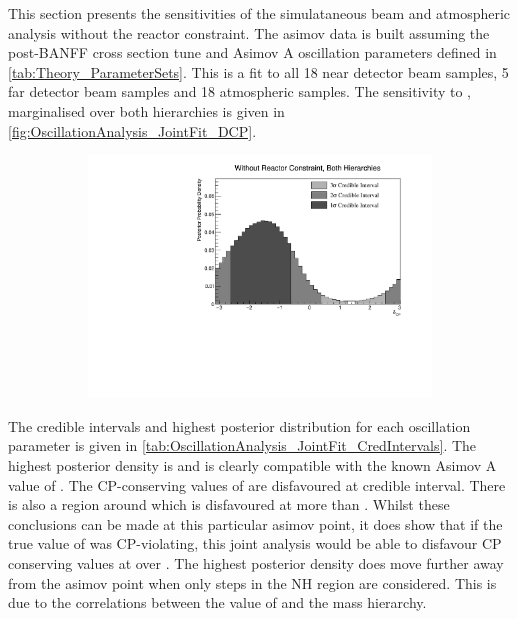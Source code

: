 This section presents the sensitivities of the simulataneous beam and atmospheric analysis without the reactor constraint. The asimov data is built assuming the post-BANFF cross section tune and Asimov A oscillation parameters defined in \autoref{tab:Theory_ParameterSets}. This is a fit to all 18 near detector beam samples, 5 far detector beam samples and 18 atmospheric samples. The sensitivity to \dcp, marginalised over both hierarchies is given in \autoref{fig:OscillationAnalysis_JointFit_DCP}.

\begin{figure}[h]
  \begin{subfigure}[t]{1.0\textwidth}
    \includegraphics[width=\textwidth, trim={0mm 0mm 0mm 0mm}, clip,page=1]{Figures/OA/JointFit/Contours_1D_dcp_BH_1_woRC_UnSmeared_CredibleInterval.pdf}
  \end{subfigure}
  \caption{}
  \label{fig:OscillationAnalysis_JointFit_DCP}
\end{figure}

The credible intervals and highest posterior distribution for each oscillation parameter is given in \autoref{tab:OscillationAnalysis_JointFit_CredIntervals}. The highest posterior density is  and is clearly compatible with the known Asimov A value of . The CP-conserving values of  are disfavoured at \quickmath{1\sigma} credible interval. There is also a region around  which is disfavoured at more than \quickmath{3\sigma}. Whilst these conclusions can be made at this particular asimov point, it does show that if the true value of  was CP-violating, this joint analysis would be able to disfavour CP conserving values at over \quickmath{1\sigma}. The highest posterior density does move further away from the asimov point when only steps in the NH region are considered. This is due to the correlations between the value of \dcp and the mass hierarchy. 

